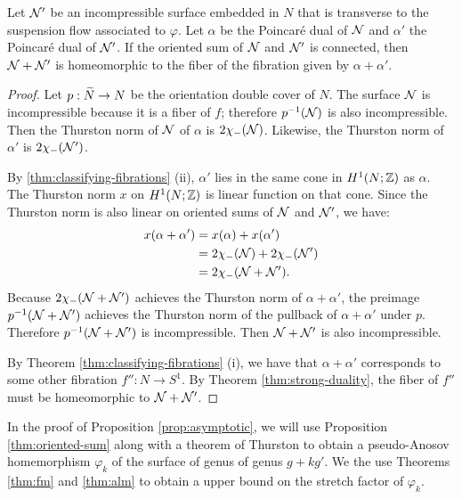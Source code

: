 \begin{prop}
  \label{thm:oriented-sum}
  Let $\mathcal{N}'$ be an incompressible surface embedded in $N$ that is transverse to the suspension flow associated to $\varphi$.
  Let $\alpha$ be the Poincar\'e dual of $\mathcal{N}$ and $\alpha'$ the Poincar\'e dual of $\mathcal{N}'$.
  If the oriented sum of $\mathcal{N}$ and $\mathcal{N}'$ is connected, then $\mathcal{N} + \mathcal{N}'$ is homeomorphic to the fiber of the fibration given by $\alpha + \alpha'$.
\end{prop}
\begin{proof}
  Let $p:\widetilde{N}\rightarrow N$ be the orientation double cover of $N$.
  The surface $\mathcal{N}$ is incompressible because it is a fiber of $f$; therefore $p^{-1}(\mathcal{N})$ is also incompressible.  Then the Thurston norm of $\mathcal{N}$ of $\alpha$ is $2\chi_-(\mathcal{N})$.  Likewise, the Thurston norm of $\alpha'$ is $2\chi_-(\mathcal{N}')$.

By \autoref{thm:classifying-fibrations} (ii), $\alpha'$ lies in the same cone in $H^1(N;\mathbb{Z})$ as $\alpha$.  The Thurston norm $x$ on $H^1(N;\mathbb{Z})$ is linear function on that cone.
 Since the Thurston norm is also linear on oriented sums of $\mathcal{N}$ and $\mathcal{N}'$, we have:
  \begin{align*}
    x(\alpha + \alpha') &= x(\alpha) + x(\alpha') \\
                        &= 2\chi_-(\mathcal{N}) + 2\chi_-(\mathcal{N}') \\
                        &= 2\chi_-(\mathcal{N} + \mathcal{N}').
  \end{align*}
  Because $2\chi_-(\mathcal{N}+\mathcal{N}')$ achieves the Thurston norm of $\alpha+\alpha'$, the preimage $p^{-1}(\mathcal{N}+\mathcal{N}')$ achieves the Thurston norm of the pullback of $\alpha+\alpha'$ under $p$.  Therefore $p^{-1}(\mathcal{N}+\mathcal{N}')$ is incompressible.  Then $\mathcal{N}+\mathcal{N}'$ is also incompressible.


  By Theorem \ref{thm:classifying-fibrations} (i), we have that $\alpha + \alpha'$ corresponds to some other fibration $f'':N\rightarrow S^1$.
  By Theorem \ref{thm:strong-duality}, the fiber of $f''$ must be homeomorphic to $\mathcal{N} + \mathcal{N}'$.  %
\end{proof}

In the proof of Proposition \ref{prop:asymptotic}, we will use Proposition \ref{thm:oriented-sum} along with a theorem of Thurston to obtain a pseudo-Anosov homemorphism $\varphi_k$ of the surface of genus of genus $g+kg'$.  We the use Theorems \ref{thm:fm} and \ref{thm:alm} to obtain a upper bound on the stretch factor of $\varphi_k$.


